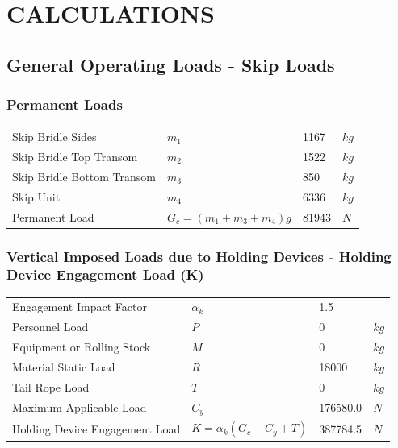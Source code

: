 \documentclass{article}%
\begin{document}
%
\newpage

%
\section{CALCULATIONS}%
\label{sec:CALCULATIONS}%
\subsection{General Operating Loads {-} Skip Loads}%
\label{subsec:GeneralOperatingLoads{-}SkipLoads}%
\subsubsection{Permanent Loads}%
\label{ssubsec:PermanentLoads}%
\begin{flushleft}%
\begin{minipage}{\textwidth}%
\flushleft%
\begin{tabular}{l l l l}%
Skip Bridle Sides&$m_1$&1167&$kg$\\%
Skip Bridle Top Transom&$m_2$&1522&$kg$\\%
Skip Bridle Bottom Transom&$m_3$&850&$kg$\\%
Skip Unit&$m_4$&6336&$kg$\\%
Permanent Load&$G_c = (m_1 + m_3 + m_4)g$&81943&$N$\\%
\end{tabular}%
\end{minipage}%
\end{flushleft}

%
\subsubsection{Vertical Imposed Loads due to Holding Devices {-} Holding Device Engagement Load (K)}%
\label{ssubsec:VerticalImposedLoadsduetoHoldingDevices{-}HoldingDeviceEngagementLoad(K)}%
\begin{flushleft}%
\begin{minipage}{\textwidth}%
\flushleft%
\begin{tabular}{l l l l}%
Engagement Impact Factor&$\alpha_k$&1.5&\\%
Personnel Load&$P$&0&$kg$\\%
Equipment or Rolling Stock&$M$&0&$kg$\\%
Material Static Load&$R$&18000&$kg$\\%
Tail Rope Load&$T$&0&$kg$\\%
Maximum Applicable Load&$C_y$&176580.0&$N$\\%
Holding Device Engagement Load&$K = \alpha_k(G_c+C_y+T)$&387784.5&$N$\\%
\end{tabular}%
\end{minipage}%
\end{flushleft}
\end{document}

